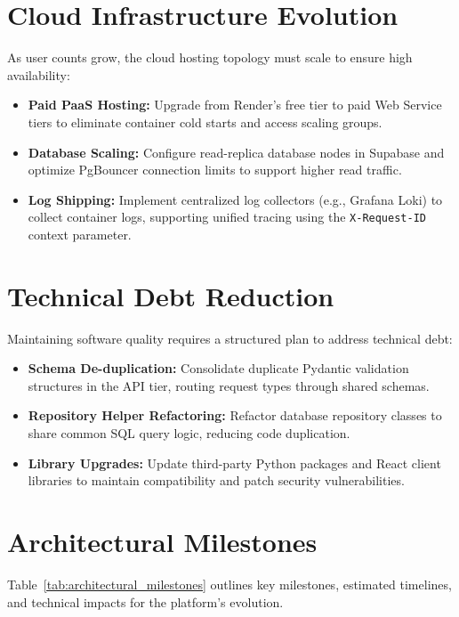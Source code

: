 \section{Cloud Infrastructure Evolution}
As user counts grow, the cloud hosting topology must scale to ensure high availability:
\begin{itemize}
    \item \textbf{Paid PaaS Hosting:} Upgrade from Render's free tier to paid Web Service tiers to eliminate container cold starts and access scaling groups.
    \item \textbf{Database Scaling:} Configure read-replica database nodes in Supabase and optimize PgBouncer connection limits to support higher read traffic.
    \item \textbf{Log Shipping:} Implement centralized log collectors (e.g., Grafana Loki) to collect container logs, supporting unified tracing using the \texttt{X-Request-ID} context parameter.
\end{itemize}

\section{Technical Debt Reduction}
Maintaining software quality requires a structured plan to address technical debt:
\begin{itemize}
    \item \textbf{Schema De-duplication:} Consolidate duplicate Pydantic validation structures in the API tier, routing request types through shared schemas.
    \item \textbf{Repository Helper Refactoring:} Refactor database repository classes to share common SQL query logic, reducing code duplication.
    \item \textbf{Library Upgrades:} Update third-party Python packages and React client libraries to maintain compatibility and patch security vulnerabilities.
\end{itemize}

\pagebreak
\section{Architectural Milestones}
Table~\ref{tab:architectural_milestones} outlines key milestones, estimated timelines, and technical impacts for the platform's evolution.

